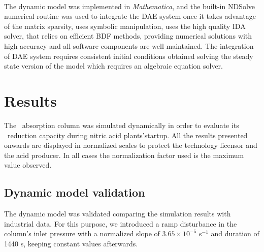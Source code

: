 \documentclass[journal=jacsat,manuscript=article]{achemso}
\newcommand{\nox}{\ce{NO_{\rmfamily{x}}}}
\newcommand{\Mathematica}{\textit{Mathematica}\textsuperscript{\tiny\textregistered}}
\begin{document}
The dynamic model was implemented in \Mathematica, and the built-in NDSolve numerical routine was used to integrate the DAE system once it takes advantage of the matrix sparsity, uses symbolic manipulation, uses the high quality IDA solver, that relies on efficient BDF methods, providing numerical solutions with high accuracy and all software components are well maintained. 
The integration of DAE system requires consistent initial conditions obtained solving the steady state version of the model which requires an algebraic equation solver.

\section{Results}

The \nox~absorption column was simulated dynamically in order to evaluate its \nox~reduction capacity during nitric acid plants'startup.
All the results presented onwards are displayed in normalized scales to protect the technology licensor and the acid producer. In all cases the normalization factor used is the maximum value observed. 

\subsection{Dynamic model validation}
The dynamic model was validated comparing the simulation results with industrial data.
For this purpose, we introduced a ramp disturbance in the column's inlet pressure with a normalized slope of $3.65\times10^{-5}$ s$^{-1}$ and duration of 1440 s, keeping constant values afterwards. 
\end{document}
